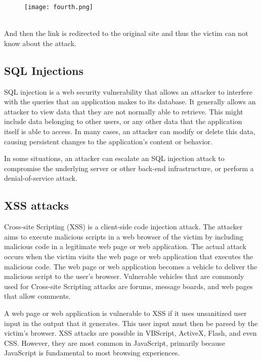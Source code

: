 \documentclass[a4paper,12pt]{article}
\begin{document}
\begin{figure}[htbp]
\texttt{[image: fourth.png]}
\end{figure}\\

And then the link is redirected to the original site and thus the victim can not know about the attack.\\ 





\subsection{SQL Injections}
SQL injection is a web security vulnerability that allows an attacker to interfere with the queries that an application makes to its database. It generally allows an attacker to view data that they are not normally able to retrieve. This might include data belonging to other users, or any other data that the application itself is able to access. In many cases, an attacker can modify or delete this data, causing persistent changes to the application's content or behavior.

In some situations, an attacker can escalate an SQL injection attack to compromise the underlying server or other back-end infrastructure, or perform a denial-of-service attack.

\subsection{XSS attacks}
Cross-site Scripting (XSS) is a client-side code injection attack. The attacker aims to execute malicious scripts in a web browser of the victim by including malicious code in a legitimate web page or web application. The actual attack occurs when the victim visits the web page or web application that executes the malicious code. The web page or web application becomes a vehicle to deliver the malicious script to the user’s browser. Vulnerable vehicles that are commonly used for Cross-site Scripting attacks are forums, message boards, and web pages that allow comments.

A web page or web application is vulnerable to XSS if it uses unsanitized user input in the output that it generates. This user input must then be parsed by the victim’s browser. XSS attacks are possible in VBScript, ActiveX, Flash, and even CSS. However, they are most common in JavaScript, primarily because JavaScript is fundamental to most browsing experiences.
\end{document}
